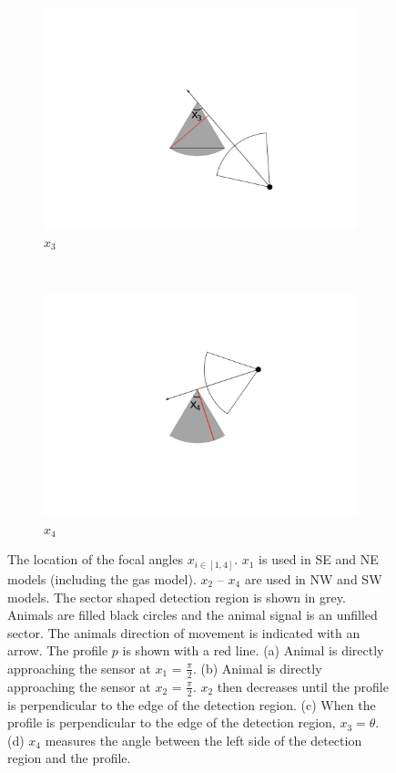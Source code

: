 \begin{figure}[t]
\begin{subfigure}[t]{0.22\textwidth}
                \centering
        \includegraphics[width=1\textwidth, trim=9cm 2cm 9cm 2cm]{imgs/x3.pdf}
                \caption{$x_3$}               
                \label{f:x3}
        \end{subfigure}%
	~
	\begin{subfigure}[t]{0.22\textwidth}
                \centering
        \includegraphics[width=1\textwidth, trim=9cm 2cm 9cm 2cm]{imgs/x4.pdf}
                \caption{$x_4$}               
                \label{f:x4}
        \end{subfigure}%
\caption{The location of the focal angles $x_{i\in[1,4]}$. $x_1$ is used in SE and NE models (including the gas model). $x_2$ -- $x_4$ are used in NW and SW models. The sector shaped detection region is shown in grey. Animals are filled black circles and the animal signal is an unfilled sector. The animals direction of movement is indicated with an arrow. The profile $p$ is shown with a red line. (a) Animal is directly approaching the sensor at $x_1$ = $\frac{\pi}{2}$. (b) Animal is directly approaching the sensor at $x_2$ = $\frac{\pi}{2}$. $x_2$ then decreases until the profile is perpendicular to the edge of the detection region. (c) When the profile is perpendicular to the edge of the detection region, $x_3 = \theta$. (d) $x_4$ measures the angle between the left side of the detection region and the profile.}

\label{f:xis}
\end{figure}
